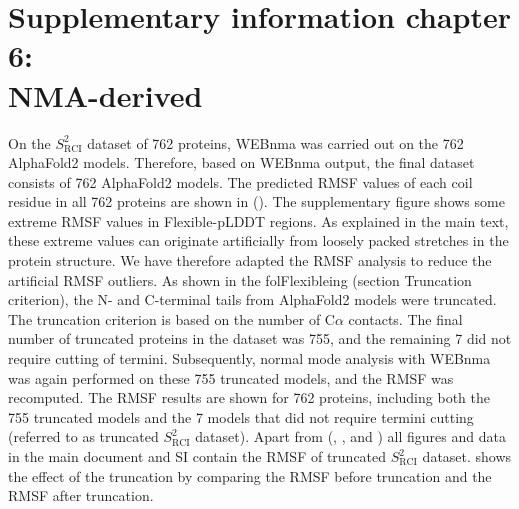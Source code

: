 \chapter*{Supplementary information chapter 6: \\NMA-derived}


\newpage

On the $S_{\text{RCI}}^{2}$ dataset of 762 proteins, WEBnma was carried out on the 762 AlphaFold2 models. Therefore, based on WEBnma output, the final dataset consists of 762 AlphaFold2 models. The predicted RMSF values of each coil residue in all 762 proteins are shown in (). The supplementary figure shows some extreme RMSF values in Flexible-pLDDT regions. As explained in the main text, these extreme values can originate artificially from loosely packed stretches in the protein structure. We have therefore adapted the RMSF analysis to reduce the artificial RMSF outliers. As shown in the folFlexibleing (section Truncation criterion), the N- and C-terminal tails from AlphaFold2 models were truncated. The truncation criterion is based on the number of C$\alpha$ contacts. The final number of truncated proteins in the dataset was 755, and the remaining 7 did not require cutting of termini. Subsequently, normal mode analysis with WEBnma was again performed on these 755 truncated models, and the RMSF was recomputed. The RMSF results are shown for 762 proteins, including both the 755 truncated models and the 7 models that did not require termini cutting (referred to as truncated $S_{\text{RCI}}^{2}$ dataset). Apart from (, , and ) all figures and data in the main document and SI contain the RMSF of truncated $S_{\text{RCI}}^{2}$ dataset.  shows the effect of the truncation by comparing the RMSF before truncation and the RMSF after truncation.
\newpage

